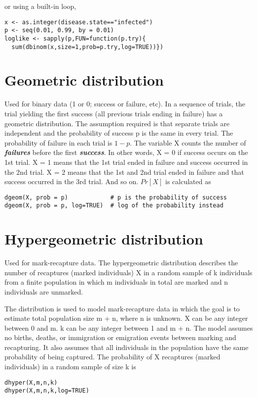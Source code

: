 \documentclass[12pt, a4paper]{article}
\theoremstyle{plain}
\theoremstyle{definition}
\theoremstyle{remark}
\begin{document}
or using a built-in loop,
\begin{framed}
\begin{verbatim}
x <- as.integer(disease.state=="infected")
p <- seq(0.01, 0.99, by = 0.01)
loglike <- sapply(p,FUN=function(p.try){
  sum(dbinom(x,size=1,prob=p.try,log=TRUE))})
\end{verbatim}
\end{framed}
\newpage
\section{Geometric distribution}
Used for binary data (1 or 0; success or failure, etc). In a sequence of trials, the trial yielding the first success (all previous trials ending in failure) has a geometric distribution. The assumption required is that separate trials are independent and the probability of success p is the same in every trial. The probability of failure in each trial is $1 - p$.
\newpage
The variable X counts the number of \textbf{\textit{failures}} before the first \textbf{\textit{success}}. In other words, X = 0 if success occurs on the 1st trial. X = 1 means that the 1st trial ended in failure and success occurred in the 2nd trial. X = 2 means that the 1st and 2nd trial ended in failure and that success occurred in the 3rd trial. And so on. $Pr[X]$ is calculated as
\begin{framed}
\begin{verbatim}
dgeom(X, prob = p)            # p is the probability of success
dgeom(X, prob = p, log=TRUE)  # log of the probability instead
\end{verbatim}
\end{framed}

\newpage
\section{Hypergeometric distribution}
Used for mark-recapture data. The hypergeometric distribution describes the number of recaptures (marked individuals) X in a random sample of k individuals from a finite population in which m individuals in total are marked and n individuals are unmarked.

The distribution is used to model mark-recapture data in which the goal is to estimate total population size m + n, where n is unknown. X can be any integer between 0 and m. k can be any integer between 1 and m + n. The model assumes no births, deaths, or immigration or emigration events between marking and recapturing. It also assumes that all individuals in the population have the same probability of being captured. The probability of X recaptures (marked individuals) in a random sample of size k is
\begin{framed}
\begin{verbatim}
dhyper(X,m,n,k)
dhyper(X,m,n,k,log=TRUE)
\end{verbatim}
\end{framed}
\newpage
\end{document}
